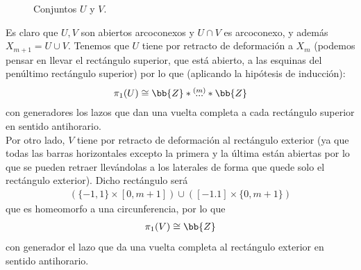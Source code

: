 \begin{ejemplo}
\begin{enumerate}
\begin{figure}[ht]
            \caption{Conjuntos $U$ y $V$.}
            \label{fig:conjuntos_U_V2}
        \end{figure}

        Es claro que $U,V$ son abiertos arcoconexos y $U\cap V$ es arcoconexo, y además $X_{m+1}=U\cup V$. Tenemos que $U$ tiene por retracto de deformación a $X_m$ (podemos pensar en llevar el rectángulo superior, que está abierto, a las esquinas del penúltimo rectángulo superior) por lo que (aplicando la hipótesis de inducción):
        \begin{align*}
            \pi_1(U)\cong \bb{Z} \ast \overset{(m)}{...} \ast \bb{Z}
        \end{align*}
        con generadores los lazos que dan una vuelta completa a cada rectángulo superior en sentido antihorario.\\

        Por otro lado, $V$ tiene por retracto de deformación al rectángulo exterior (ya que todas las barras horizontales excepto la primera y la última están abiertas por lo que se pueden retraer llevándolas a los laterales de forma que quede solo el rectángulo exterior). Dicho rectángulo será 
        \begin{align*}
            (\{-1,1\}\times [0,m+1])\cup ([-1.1]\times \{0,m+1\})
        \end{align*}
        que es homeomorfo a una circunferencia, por lo que 
        \begin{align*}
            \pi_1(V) \cong \bb{Z}
        \end{align*}
        con generador el lazo que da una vuelta completa al rectángulo exterior en sentido antihorario.\\


\end{enumerate}
\end{ejemplo}
